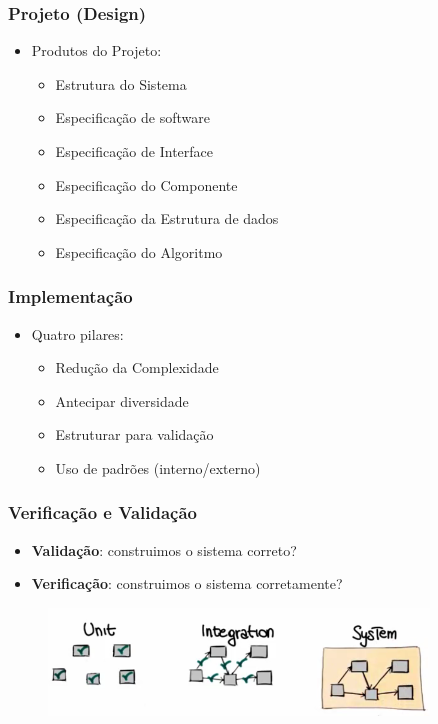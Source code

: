 \begin{frame}
 \frametitle{Projeto (Design)}
\begin{itemize}
 \item Produtos do Projeto:
 \begin{itemize}
  \item Estrutura do Sistema
  \item Especificação de software
  \item Especificação de Interface
  \item Especificação do Componente
  \item Especificação da Estrutura de dados
  \item Especificação do Algoritmo
 \end{itemize}
\end{itemize}
\end{frame}

\begin{frame}
 \frametitle{Implementação}
\begin{itemize}
 \item Quatro pilares:
 \begin{itemize}
  \item Redução da Complexidade
  \item Antecipar diversidade
  \item Estruturar para validação
  \item Uso de  padrões (interno/externo)
 \end{itemize}
\end{itemize} 
\end{frame}

\begin{frame}
 \frametitle{Verificação e Validação}
\begin{itemize}
 \item \textbf{Validação}:  construimos o sistema correto?
 \item \textbf{Verificação}: construimos o sistema corretamente?
\end{itemize} 
 \begin{figure}
 \includegraphics[width = 0.9\textwidth]{figs/fig23.png}
\end{figure}
\end{frame}

